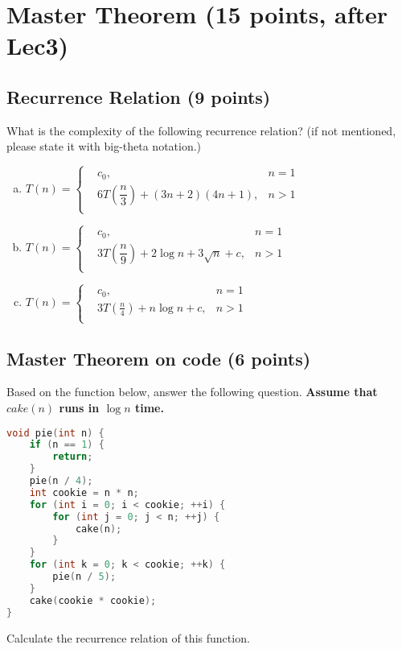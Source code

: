 \documentclass[11pt]{exam}
\begin{document}
\section{Master Theorem (15 points, after Lec3)}
\subsection{Recurrence Relation (9 points)}
What is the complexity of the following recurrence relation? (if not mentioned, please state it with big-theta notation.)
\begin{enumerate}[(a)]

\item $T(n) = \left\{
\begin{aligned}
&c_0, &n=1\\
&6T\left(\dfrac{n}{3}\right)+\left(3n+2\right)\left(4n+1\right), &n>1\\
\end{aligned}
\right.
$

\begin{solution}
\end{solution}

\item $T(n) = \left\{
\begin{aligned}
&c_0, &n=1\\
&3T\left(\dfrac{n}{9}\right)+2\log n + 3\sqrt{n}+c, &n>1\\
\end{aligned}
\right.
$


\begin{solution}
\end{solution}

\item $T(n) = \left\{
\begin{aligned}
&c_0, &n=1\\
&3T(\frac{n}{4})+n\log n + c, &n>1\\
\end{aligned}
\right.
$
\begin{solution}
\end{solution}
\end{enumerate}

\subsection{Master Theorem on code (6 points)}
Based on the function below, answer the following question. \textbf{Assume that $cake(n)$ runs in $\log n$ time.}
\begin{lstlisting}[language=c++]
void pie(int n) {
	if (n == 1) {
		return;
	}
	pie(n / 4);
	int cookie = n * n;
	for (int i = 0; i < cookie; ++i) {
		for (int j = 0; j < n; ++j) {
			cake(n);
		}
	}
	for (int k = 0; k < cookie; ++k) {
		pie(n / 5);
	}
	cake(cookie * cookie);
}
\end{lstlisting}
Calculate the recurrence relation of this function.
\begin{solution}
\end{solution}
\end{document}
